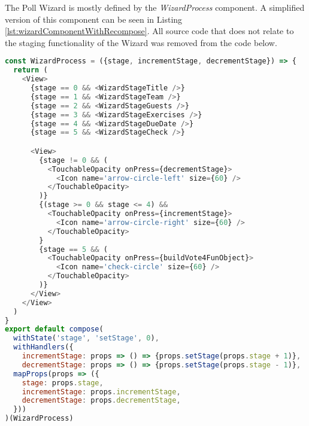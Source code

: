 The Poll Wizard is mostly defined by the \textit{WizardProcess} component. A simplified version of this component can be seen in Listing \ref{lst:wizardComponentWithRecompose}. All source code that does not relate to the staging functionality of the Wizard was removed from the code below.

\begin{lstlisting}[language=javascript,caption=Simplified Wizard Component using \textit{recompose},label=lst:wizardComponentWithRecompose]
const WizardProcess = ({stage, incrementStage, decrementStage}) => {
  return (
    <View>
      {stage == 0 && <WizardStageTitle />}
      {stage == 1 && <WizardStageTeam />}
      {stage == 2 && <WizardStageGuests />}
      {stage == 3 && <WizardStageExercises />}
      {stage == 4 && <WizardStageDueDate />}
      {stage == 5 && <WizardStageCheck />}

      <View>
        {stage != 0 && (
          <TouchableOpacity onPress={decrementStage}>
            <Icon name='arrow-circle-left' size={60} />
          </TouchableOpacity>
        )}
        {(stage >= 0 && stage <= 4) &&
          <TouchableOpacity onPress={incrementStage}>
            <Icon name='arrow-circle-right' size={60} />
          </TouchableOpacity>
        }
        {stage == 5 && (
          <TouchableOpacity onPress={buildVote4FunObject}>
            <Icon name='check-circle' size={60} />
          </TouchableOpacity>
        )}
      </View>
    </View>
  )
}
export default compose(
  withState('stage', 'setStage', 0),
  withHandlers({
    incrementStage: props => () => {props.setStage(props.stage + 1)},
    decrementStage: props => () => {props.setStage(props.stage - 1)},
  mapProps(props => ({
    stage: props.stage,
    incrementStage: props.incrementStage,
    decrementStage: props.decrementStage,
  }))
)(WizardProcess)
\end{lstlisting}

